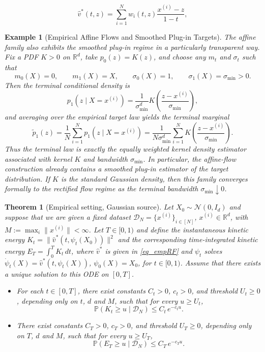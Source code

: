 \documentclass[10pt,a4paper]{amsart}
\newtheorem{example}{Example}
\newtheorem{theorem}{Theorem}
\newcommand{\R}{\mathbb{R}}
\begin{document}
\begin{equation} \label{eq_empRF}
    \hat{v}^*(t, z) = \sum_{i=1}^N w_i(t, z) \frac{x^{(i)}-z}{1-t},
\end{equation}

\begin{example}[Empirical Affine Flows and Smoothed Plug-in Targets]  \label{eg_empaffineflows}
The affine family also exhibits the smoothed plug-in regime in a particularly transparent way. Fix a  PDF $K > 0$ on $\R^d$, take $p_0(z)=K(z)$, and choose any $m_t$ and $\sigma_t$ such that
\[
m_0(X)=0, \qquad m_1(X)=X, \qquad \sigma_0(X)=1, \qquad \sigma_1(X)=\sigma_{\min}>0.
\]
Then the terminal conditional density is
\[
p_1(z\mid X=x^{(i)}) = \frac{1}{\sigma_{\min}^d}K\!\left(\frac{z-x^{(i)}}{\sigma_{\min}}\right),
\]
and averaging over the empirical target law yields the terminal marginal
\[
\tilde p_1(z)=\frac1N\sum_{i=1}^N p_1(z\mid X=x^{(i)})
=\frac{1}{N \sigma_{\min}^d} \sum_{i=1}^N K\!\left(\frac{z-x^{(i)}}{\sigma_{\min}}\right).
\]
Thus the terminal law is exactly the equally weighted kernel density estimator associated with kernel $K$ and bandwidth $\sigma_{\min}$. In particular, the affine-flow construction already contains a smoothed plug-in estimator of the target distribution. If $K$ is the standard Gaussian density, then this family converges formally to the rectified flow regime as the terminal bandwidth $\sigma_{\min} \downarrow 0$.
\end{example}

\begin{theorem}[Empirical setting, Gaussian source] \label{thm1}
Let $X_0 \sim \mathcal{N}(0, I_d)$ and suppose that we are given a fixed dataset $\mathcal{D}_N = \{x^{(i)}\}_{i \in [N]}$, $x^{(i)} \in \R^d$, with $M := \max_i \|x^{(i)}\| < \infty$.
Let $T \in [0,1)$ and define the instantaneous kinetic energy $K_t = \|\hat{v}^*(t, \psi_t(X_0))\|^2$ and the corresponding time-integrated kinetic energy $E_T = \int_0^T K_t \, dt$, where $\hat{v}^*$ is given in \eqref{eq_empRF} and $\psi_t$ solves $\dot{\psi}_t(X) = \hat{v}^*(t, \psi_t(X))$, $\psi_0(X) = X_0$, for $t \in [0, 1)$. Assume that there exists a unique solution to this ODE on $[0,T]$.

    \begin{itemize}
        \item[(a)] For each $t \in [0, T]$, there exist constants $C_t>0$, $c_t>0$, and threshold $U_t\ge 0$, depending only on $t$, $d$ and $M$, such that for every $u \ge U_t$,
        $$\mathbb{P}(K_t \ge u \mid \mathcal{D}_N) \le C_t \, e^{-c_t u}. $$
        \item[(b)] There exist constants $C_T>0$, $c_T>0$, and threshold  $U_T\ge 0$, depending only on $T$, $d$ and $M$, such that for every $u \ge U_T$,
        $$\mathbb{P}(E_T \ge u \mid \mathcal{D}_N) \le C_T \, e^{-c_T u}. $$
    \end{itemize} 
\end{theorem}
\end{document}
